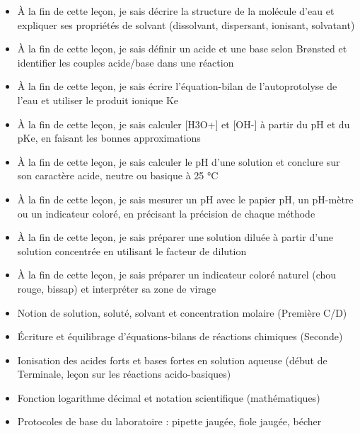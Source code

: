 \documentclass[11pt]{article}
\begin{document}
\begin{objectifs}
\begin{itemize}
\item À la fin de cette leçon, je sais décrire la structure de la molécule d'eau et expliquer ses propriétés de solvant (dissolvant, dispersant, ionisant, solvatant)
\item À la fin de cette leçon, je sais définir un acide et une base selon Brønsted et identifier les couples acide/base dans une réaction
\item À la fin de cette leçon, je sais écrire l'équation-bilan de l'autoprotolyse de l'eau et utiliser le produit ionique Ke
\item À la fin de cette leçon, je sais calculer [H3O+] et [OH-] à partir du pH et du pKe, en faisant les bonnes approximations
\item À la fin de cette leçon, je sais calculer le pH d'une solution et conclure sur son caractère acide, neutre ou basique à 25 °C
\item À la fin de cette leçon, je sais mesurer un pH avec le papier pH, un pH-mètre ou un indicateur coloré, en précisant la précision de chaque méthode
\item À la fin de cette leçon, je sais préparer une solution diluée à partir d'une solution concentrée en utilisant le facteur de dilution
\item À la fin de cette leçon, je sais préparer un indicateur coloré naturel (chou rouge, bissap) et interpréter sa zone de virage
\end{itemize}
\end{objectifs}

\begin{prerequis}
\begin{itemize}
\item Notion de solution, soluté, solvant et concentration molaire (Première C/D)
\item Écriture et équilibrage d'équations-bilans de réactions chimiques (Seconde)
\item Ionisation des acides forts et bases fortes en solution aqueuse (début de Terminale, leçon sur les réactions acido-basiques)
\item Fonction logarithme décimal et notation scientifique (mathématiques)
\item Protocoles de base du laboratoire : pipette jaugée, fiole jaugée, bécher
\end{itemize}
\end{prerequis}
\end{document}
